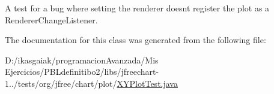 A test for a bug where setting the renderer doesn\textquotesingle{}t register the plot as a Renderer\+Change\+Listener. 

The documentation for this class was generated from the following file\+:\begin{DoxyCompactItemize}
\item 
D\+:/ikasgaiak/programacion\+Avanzada/\+Mis Ejercicios/\+P\+B\+Ldefinitibo2/libs/jfreechart-\/1../tests/org/jfree/chart/plot/\mbox{\hyperlink{_x_y_plot_test_8java}{X\+Y\+Plot\+Test.\+java}}\end{DoxyCompactItemize}

